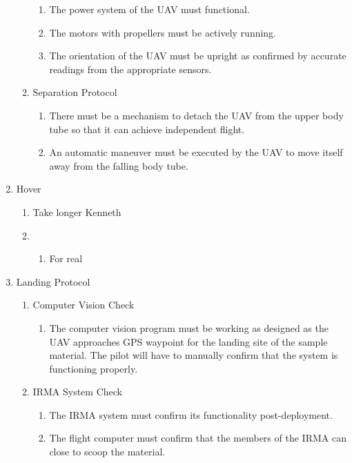 \begin{enumerate}[noitemsep, label=\arabic*.]
\begin{enumerate}[noitemsep, label=1.\arabic*.]
\begin{enumerate}[noitemsep, label=1.4.\arabic*.]
			\item The power system of the UAV must functional.
			\item The motors with propellers must be actively running.
			\item The orientation of the UAV must be upright as confirmed by accurate readings from the appropriate sensors.
		\end{enumerate}
		\item Separation Protocol
		\begin{enumerate}[noitemsep, label=1.5.\arabic*.]
			\item There must be a mechanism to detach the UAV from the upper body tube so that it can achieve independent flight.
			\item An automatic maneuver must be executed by the UAV to move itself away from the falling body tube.
		\end{enumerate}
	\end{enumerate}
	\item Hover
	\begin{enumerate}[noitemsep, label=2.\arabic*.]
		\item Take longer Kenneth
		\item \begin{enumerate}[noitemsep, label=2.1.\arabic*.]
			\item For real
		\end{enumerate}
	\end{enumerate}
	\item Landing Protocol
	\begin{enumerate}[noitemsep, label=3.\arabic*.]
		\item Computer Vision Check
		\begin{enumerate}[noitemsep, label=3.1.\arabic*.]
			\item The computer vision program must be working as designed as the UAV approaches GPS waypoint for the landing site of the sample material. The pilot will have to manually confirm that the system is functioning properly.
		\end{enumerate}
		\item IRMA System Check
		\begin{enumerate}[noitemsep, label=3.2.\arabic*.]
			\item The IRMA system must confirm its functionality post-deployment.
			\item The flight computer must confirm that the members of the IRMA can close to scoop the material. 
		\end{enumerate}

\end{enumerate}
\end{enumerate}
